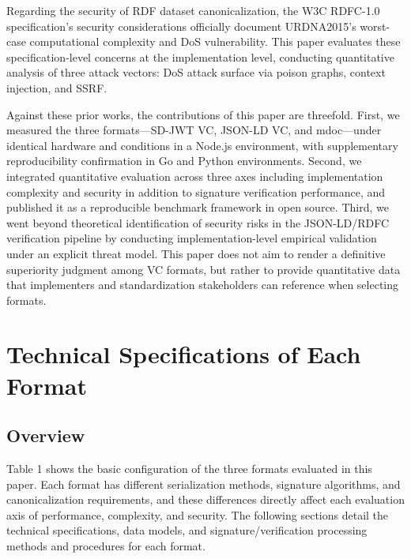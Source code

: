 \documentclass[conference]{IEEEtran}
\begin{document}
Regarding the security of RDF dataset canonicalization, the W3C RDFC-1.0 specification's security considerations \cite{ref9} officially document URDNA2015's worst-case computational complexity and DoS vulnerability. This paper evaluates these specification-level concerns at the implementation level, conducting quantitative analysis of three attack vectors: DoS attack surface via poison graphs, context injection, and SSRF.

Against these prior works, the contributions of this paper are threefold. First, we measured the three formats---SD-JWT VC, JSON-LD VC, and mdoc---under identical hardware and conditions in a Node.js environment, with supplementary reproducibility confirmation in Go and Python environments. Second, we integrated quantitative evaluation across three axes including implementation complexity and security in addition to signature verification performance, and published it as a reproducible benchmark framework in open source. Third, we went beyond theoretical identification of security risks in the JSON-LD/RDFC verification pipeline by conducting implementation-level empirical validation under an explicit threat model. This paper does not aim to render a definitive superiority judgment among VC formats, but rather to provide quantitative data that implementers and standardization stakeholders can reference when selecting formats.

\section{Technical Specifications of Each Format}

\subsection{Overview}

Table 1 shows the basic configuration of the three formats evaluated in this paper. Each format has different serialization methods, signature algorithms, and canonicalization requirements, and these differences directly affect each evaluation axis of performance, complexity, and security. The following sections detail the technical specifications, data models, and signature/verification processing methods and procedures for each format.


\begin{table}[!t]
\centering
\caption{Table 1. Basic Configuration of Evaluated Formats}\label{tab:1}
\footnotesize
{}
\end{table}
\end{document}
